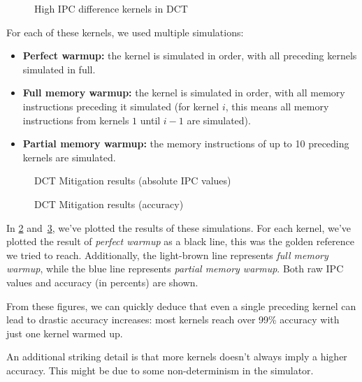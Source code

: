\begin{figure}
    \centering
    
    \caption{High IPC difference kernels in DCT}
    \label{fig:dct_kernels}
\end{figure}

For each of these kernels, we used multiple simulations:
\begin{itemize}
    \item \textbf{Perfect warmup:} the kernel is simulated in order, with all preceding kernels simulated in full.
    \item \textbf{Full memory warmup:} the kernel is simulated in order, with all memory instructions preceding it simulated (for kernel $i$, this means all memory instructions from kernels $1$ until $i - 1$ are simulated).
    \item \textbf{Partial memory warmup:} the memory instructions of up to 10 preceding kernels are simulated.
\end{itemize}

\begin{figure}
    \centering
    \resizebox{0.45\textwidth}{!}{}
    \resizebox{0.45\textwidth}{!}{}
    \resizebox{0.45\textwidth}{!}{}
    \resizebox{0.45\textwidth}{!}{}
    
    \caption{DCT Mitigation results (absolute IPC values)}
    \label{fig:mitig_abs}
\end{figure}

\begin{figure}
    \centering
    \resizebox{0.45\textwidth}{!}{}
    \resizebox{0.45\textwidth}{!}{}
    \resizebox{0.45\textwidth}{!}{}
    \resizebox{0.45\textwidth}{!}{}
    
    \caption{DCT Mitigation results (accuracy)}
    \label{fig:mitig_acc}
\end{figure}

In \cref{fig:mitig_abs} and\ \ref{fig:mitig_acc}, we've plotted the results of these simulations.
For each kernel, we've plotted the result of \textit{perfect warmup} as a black line, this was the golden reference we tried to reach.
Additionally, the light-brown line represents \textit{full memory warmup}, while the blue line represents \textit{partial memory warmup}.
Both raw IPC values and accuracy (in percents) are shown.

From these figures, we can quickly deduce that even a single preceding kernel can lead to drastic accuracy increases: most kernels reach over 99\% accuracy with just one kernel warmed up.

An additional striking detail is that more kernels doesn't always imply a higher accuracy.
This might be due to some non-determinism in the simulator.